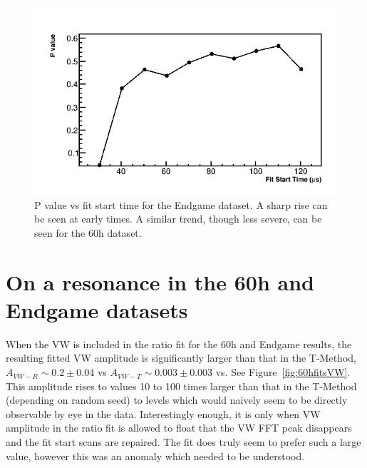 \documentclass[12pt,letterpaper]{article}
\newcommand{\figref}[1]{Figure~\ref{#1}}
\begin{document}
\begin{figure}[]
    \centering
    \includegraphics[width=.5\textwidth]{Pvalue_Endgame_noRand}
    \caption[]{P value vs fit start time for the Endgame dataset. A sharp rise can be seen at early times. A similar trend, though less severe, can be seen for the 60h dataset.}
    \label{fig:Pvalue_Endgame}
\end{figure}

\clearpage

\section{On a resonance in the 60h and Endgame datasets}

When the VW is included in the ratio fit for the 60h and Endgame results, the resulting fitted VW amplitude is significantly larger than that in the T-Method, $A_{VW-R} \sim 0.2 \pm 0.04$ vs $A_{VW-T} \sim 0.003 \pm 0.003$ vs. See \figref{fig:60hfitsVW}. This amplitude rises to values 10 to 100 times larger than that in the T-Method (depending on random seed) to levels which would naively seem to be directly observable by eye in the data. Interestingly enough, it is only when VW amplitude in the ratio fit is allowed to float that the VW FFT peak disappears and the fit start scans are repaired. The fit does truly seem to prefer such a large value, however this was an anomaly which needed to be understood.
\end{document}
